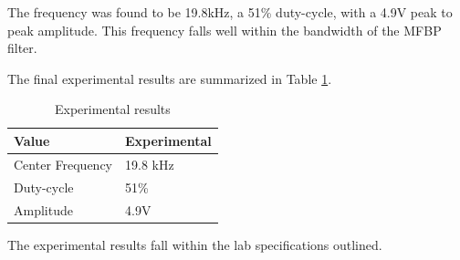 The frequency was found to be 19.8kHz, a 51\% duty-cycle, with a 4.9V peak to peak amplitude. This frequency falls well within the bandwidth of the MFBP filter.


The final experimental results are summarized in Table \ref{tab:expfinal}.

\begin{table}[H]
\centering
\caption{Experimental results}
\label{tab:expfinal}
\begin{tabular}{|l|l|}
\hline
Value            & Experimental \\ \hline
Center Frequency & 19.8 kHz     \\ \hline
Duty-cycle       & 51\%      \\ \hline
Amplitude        & 4.9V     \\ \hline
\end{tabular}
\end{table}

The experimental results fall within the lab specifications outlined.



